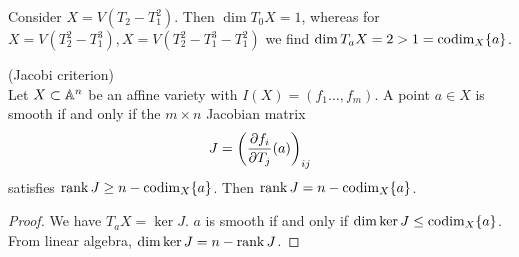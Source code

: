 \documentclass[a4paper,11pt]{article}
\begin{document}
			\begin{eg}
				Consider $X=V(T_2-T_1^2)$. Then $\dim T_0X=1$, whereas for  $X=V(T_2^2-T_1^3), X=V(T_2^2-T_1^3-T_1^2)$ we find $\dim T_aX=2>1=\codim_X\{a\}$.
			\end{eg}

			\begin{thm}(Jacobi criterion)\\
				Let $X\subset\AA^n$ be an affine variety with $I(X)=(f_1\dots,f_m)$. A point $a\in X$ is smooth if and only if the $m\times n$ Jacobian matrix 
				\begin{equation*}
					J=\left(\pd{f_i}{T_j}(a)\right)_{ij}
				\end{equation*}
				satisfies $\rank J\ge n-\codim_X\{a\}$. Then $\rank J=n-\codim_X\{a\}$.
			\end{thm}
			\begin{proof}
				We have $T_aX=\ker J$. $a$ is smooth if and only if $\dim\ker J\le \codim_X\{a\}$. From linear algebra, $\dim\ker J=n-\rank J$.
			\end{proof}
\end{document}
